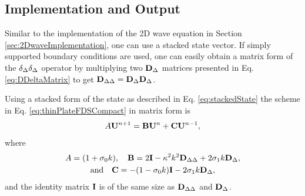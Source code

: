 \subsection{Implementation and Output}
Similar to the implementation of the 2D wave equation in Section \ref{sec:2DwaveImplementation}, one can use a stacked state vector. If simply supported boundary conditions are used, one can easily obtain a matrix form of the $\delta_{\Delta}\delta_{\Delta}$ operator by multiplying two $\mathbf{D}_\Delta$ matrices presented in Eq. \eqref{eq:DDeltaMatrix} to get $\mathbf{D}_{\Delta\Delta} = \mathbf{D}_\Delta\mathbf{D}_\Delta$.

Using a stacked form of the state as described in Eq. \eqref{eq:stackedState} the scheme in Eq. \eqref{eq:thinPlateFDSCompact} in matrix form is     
\begin{equation}\label{eq:matrixFormThinPlate}
    A\mathbf{U}^{n+1} = \mathbf{B}\mathbf{U}^n + \mathbf{C}\mathbf{U}^{n-1},
\end{equation}
where
\begin{gather*}
    A = (1+\sigma_{0} k),\quad \mathbf{B} = 2\mathbf{I} - \kappa^2 k^2 \mathbf{D}_{\Delta\Delta} + 2 \sigma_{1} k\mathbf{D}_\Delta, \\
    \text{and}\quad \mathbf{C} = -(1-\sigma_{0} k)\mathbf{I} - 2\sigma_{1} k \mathbf{D}_\Delta,
\end{gather*}
and the identity matrix $\mathbf{I}$ is of the same size as $\mathbf{D}_{\Delta\Delta}$ and $\mathbf{D}_\Delta$.

